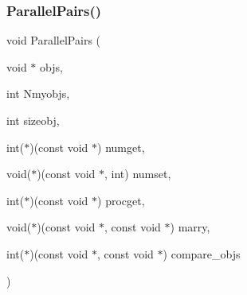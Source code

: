 \subsubsection{\texorpdfstring{Parallel\+Pairs()}{ParallelPairs()}}
{\footnotesize\ttfamily void Parallel\+Pairs (\begin{DoxyParamCaption}\item[{void $\ast$}]{objs,  }\item[{int}]{Nmyobjs,  }\item[{int}]{sizeobj,  }\item[{int($\ast$)(const void $\ast$)}]{numget,  }\item[{void($\ast$)(const void $\ast$, int)}]{numset,  }\item[{int($\ast$)(const void $\ast$)}]{procget,  }\item[{void($\ast$)(const void $\ast$, const void $\ast$)}]{marry,  }\item[{int($\ast$)(const void $\ast$, const void $\ast$)}]{compare\+\_\+objs }\end{DoxyParamCaption})}

